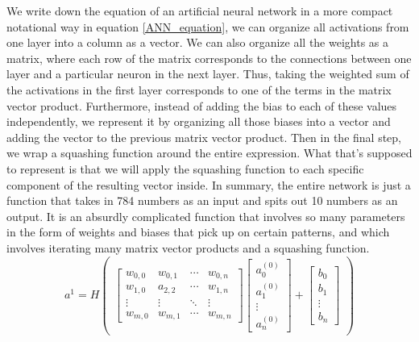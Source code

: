 \documentclass[master]{thesis-uestc}
\begin{document}
We write down the equation of an artificial neural network in a more compact notational way in equation \ref{ANN_equation}, we can organize all activations from one layer into a column as a vector. We can also organize all the weights as a matrix, where each row of the matrix corresponds to the connections between one layer and a particular neuron in the next layer. Thus, taking the weighted sum of the activations in the first layer corresponds to one of the terms in the matrix vector product. Furthermore, instead of adding the bias to each of these values independently, we represent it by organizing all those biases into a vector and adding the vector to the previous matrix vector product. Then in the final step, we wrap a squashing function around the entire expression. What that's supposed to represent is that we will apply the squashing function to each specific component of the resulting vector inside. In summary, the entire network is just a function that takes in 784 numbers as an input and spits out 10 numbers as an output. It is an absurdly complicated function that involves so many parameters in the form of weights and biases that pick up on certain patterns, and which involves iterating many matrix vector products and a squashing function.
\begin{equation}
    a^1 = 
H\begin{pmatrix}\begin{bmatrix}
  w_{0,0} & w_{0,1} & \cdots & w_{0,n} \\
  w_{1,0} & a_{2,2} & \cdots & w_{1,n} \\
  \vdots  & \vdots  & \ddots & \vdots  \\
  w_{m,0} & w_{m,1} & \cdots & w_{m,n} 
 \end{bmatrix}
 \begin{bmatrix}
  a_0^{(0)} \\
  a_1^{(0)} \\
  \vdots \\
  a_n^{(0)} 
 \end{bmatrix} + 
 \begin{bmatrix}
  b_0 \\
  b_1 \\
  \vdots \\
  b_n 
 \end{bmatrix}\end{pmatrix}
 \label{ANN_equation}
\end{equation}
\end{document}
